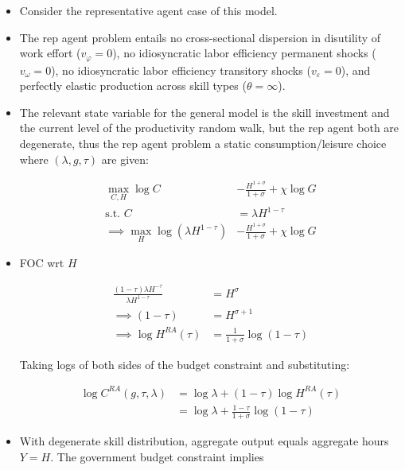 \documentclass{article}
\begin{document}
\begin{itemize}

\item Consider the representative agent case of this model.

\item The rep agent problem entails no cross-sectional dispersion in disutility of work effort ($v_\varphi = 0$), no idiosyncratic labor efficiency permanent shocks ($v_\omega = 0$), no idiosyncratic labor efficiency transitory shocks ($v_\varepsilon = 0$), and perfectly elastic production across skill types ($\theta = \infty$).

\item The relevant state variable for the general model is the skill investment and the current level of the productivity random walk, but the rep agent both are degenerate, thus the rep agent problem a static consumption/leisure choice where $(\lambda, g, \tau)$ are given:

\begin{align}
\max_{C, H} \log C &- \frac{H^{1 + \sigma}}{1 + \sigma} + \chi \log G\\
\text{s.t. } C &= \lambda H^{1-\tau} \nonumber \\
\implies \max_{H} \log (\lambda H^{1-\tau}) &- \frac{H^{1 + \sigma}}{1 + \sigma} + \chi \log G \nonumber
\end{align}

\item FOC wrt $H$

\begin{align}
\frac{(1-\tau)\lambda H^{-\tau}}{\lambda H^{1-\tau}} &= H^\sigma  \nonumber \\
\implies
(1-\tau) &= H^{\sigma+1} \nonumber \\
\implies \log H^{RA}(\tau) &= \frac{1}{1 + \sigma} \log ( 1 - \tau)
\end{align}

Taking logs of both sides of the budget constraint and substituting:

\begin{align}
\log C^{RA}(g, \tau, \lambda) 
&= \log \lambda + (1-\tau) \log H^{RA}(\tau) \nonumber \\
&= \log \lambda +  \frac{1-\tau}{1 + \sigma} \log ( 1 - \tau) \label{c_ra_lambda}
\end{align}

\item With degenerate skill distribution, aggregate output equals aggregate hours $Y=H$. The government budget constraint implies


\end{itemize}
\end{document}
